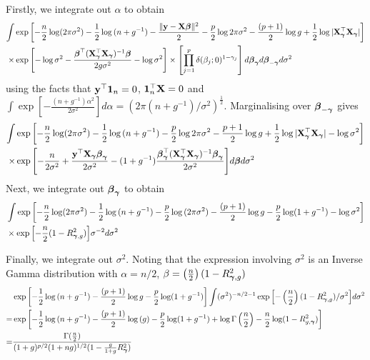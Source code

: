 \documentclass{amsart}[12pt]
\theoremstyle{definition}
\begin{document}
\noindent Firstly, we integrate out $\alpha$ to obtain
\begin{align*}
		\int & \exp{\left[-\frac{n}{2} \log (2 \pi \sigma^2) - \frac{1}{2} \log{(n + g^{-1})} - \frac{\|{\bf y}- {\bf X}{\boldsymbol\beta}\|^2}{2} 
		-\frac{p}{2} \log{2\pi \sigma^2} - \frac{(p + 1)}{2} \log{g} + \frac{1}{2} \log{|{\bf X}_{\boldsymbol\gamma}^\top {\bf X}_{\boldsymbol\gamma}|} \right]}\\
		\times&\exp{\left[- \log{\sigma^2} - \frac{{\boldsymbol\beta}^\top ({\bf X}_{\boldsymbol\gamma}^\top {\bf X}_{\boldsymbol\gamma})^{-1} {\boldsymbol\beta}}{2 g \sigma^{2}} - \log{\sigma^2}\right]} 
		\times \left[ \prod_{j=1}^p \delta(\beta_j; 0)^{1 - \gamma_j} \right] d {\boldsymbol \beta}_{{\boldsymbol \gamma}} d {\boldsymbol \beta}_{-{\boldsymbol \gamma}} d \sigma^2
\end{align*}
using the facts that ${\bf y}^\top {\bf1}_n = 0$, ${\bf 1}_n^\top {\bf X} = 0$ and $\int \exp{\left[-\frac{(n + g^{-1})\alpha^2}{2 \sigma^{2}} \right]} d \alpha = (2 \pi (n + g^{-1}) / \sigma^{2})^{\frac{1}{2}}$.
Marginalising over ${\boldsymbol \beta}_{-{\boldsymbol \gamma}}$ gives
\begin{align*}
		\int &\exp{\left[-\frac{n}{2} \log (2 \pi \sigma^2) - \frac{1}{2} \log{(n + g^{-1})}
		-\frac{p}{2} \log{2\pi \sigma^2} - \frac{p + 1}{2} \log{g}
		+ \frac{1}{2} \log{|{\bf X}_{\boldsymbol\gamma}^\top {\bf X}_{\boldsymbol\gamma}|} - \log{\sigma^2} \right]} \\
		\times&\exp{\left[- \frac{n}{2 \sigma^2}+ \frac{{\bf y}^\top{\bf X}_{\boldsymbol\gamma}{\boldsymbol\beta}_{\boldsymbol\gamma}}{2 \sigma^2} - (1 + g^{-1})\frac{{\boldsymbol\beta}_{\boldsymbol\gamma}^\top ({\bf X}_{\boldsymbol\gamma}^\top {\bf X}_{\boldsymbol\gamma})^{-1} {\boldsymbol\beta}_{\boldsymbol\gamma}}{2 \sigma^{2}} \right]} d {\boldsymbol \beta} d \sigma^2
\end{align*}
\noindent Next, we integrate out ${\boldsymbol \beta}_{{\boldsymbol \gamma}}$ to obtain
\begin{align*}
		& \int \exp{\left[-\frac{n}{2} \log (2 \pi \sigma^2) - \frac{1}{2} \log{(n + g^{-1})}
		-\frac{p}{2} \log{(2\pi \sigma^2)} - \frac{(p + 1)}{2} \log{g} - \frac{p}{2} \log (1 + g^{-1}) -\log{\sigma^2} \right]} \\
		&\times \exp{\left[-\frac{n}{2} (1 - R^2_{{\boldsymbol\gamma}, g})\right]} \sigma^{-2}
		d \sigma^2
\end{align*}

\noindent Finally, we integrate out $\sigma^2$. Noting that the expression involving $\sigma^2$ is an
Inverse Gamma distribution with $\alpha = n/2$, $\beta = \left(\frac{n}{2}\right) (1 - R^2_{{\boldsymbol \gamma}, g})$
\begin{align*}
		& \exp{\left[- \frac{1}{2} \log{(n + g^{-1})}
		- \frac{(p + 1)}{2} \log{g} - \frac{p}{2} \log (1 + g^{-1}) \right]}
		 \int (\sigma^{2})^{-n/2 - 1} \exp{\left[-\left(\frac{n}{2}\right) (1 - R^2_{{\boldsymbol\gamma}, g}) / \sigma^{2}\right]} d \sigma^2 \\
		= &\exp{\left[- \frac{1}{2} \log{(n + g^{-1})}
		- \frac{(p + 1)}{2} \log{(g)} - \frac{p}{2} \log (1 + g^{-1})
		+ \log \Gamma\left(\frac{n}{2}\right) - \frac{n}{2} \log(1 - R^2_{g, {\boldsymbol\gamma}}) \right]} \\
		= &\frac{\Gamma(\frac{n}{2})}{(1 + g)^{p/2} (1 + ng)^{1/2} (1 - \frac{g}{1 + g} R^2_{\boldsymbol \gamma})}
\end{align*}



\end{document}
